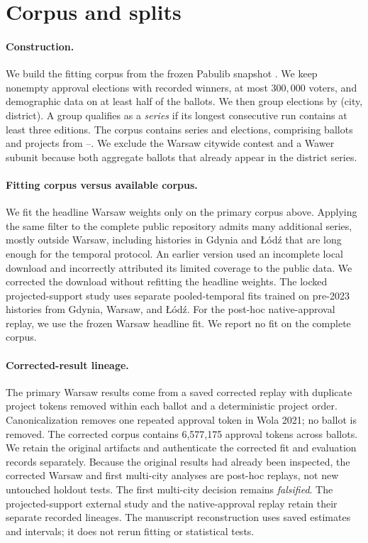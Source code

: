 \section{Corpus and splits}
\label{app:corpus}

\paragraph{Construction.}
We build the fitting corpus from the frozen Pabulib snapshot
\citep{stolicki2020pabulib}. We keep nonempty approval elections with recorded
winners, at most $300{,}000$ voters, and demographic data on at least half
of the ballots. We then group elections by (city, district). A group qualifies
as a \emph{series} if its longest consecutive run contains at least three
editions. The corpus contains
\NumSeriesTotal{} series and \PrimaryElectionN{} elections, comprising
\PrimaryBallotN{} ballots and \PrimaryProjectN{} projects from
\PrimaryYearLo--\PrimaryYearHi. We exclude the Warsaw citywide contest and a
Wawer subunit because both aggregate ballots that already appear in the
district series.

\paragraph{Fitting corpus versus available corpus.}
We fit the headline Warsaw weights only on the primary corpus above. Applying
the same filter to the complete public repository admits many additional
series, mostly outside Warsaw, including histories in Gdynia and \L{}\'od\'z
that are long enough for the temporal protocol. An earlier version used an
incomplete local download and incorrectly attributed its limited coverage to
the public data. We corrected the download without refitting the headline
weights. The locked projected-support study uses separate pooled-temporal
fits trained on pre-2023 histories from Gdynia, Warsaw, and \L{}\'od\'z. For
the post-hoc native-approval replay, we use the frozen Warsaw headline fit.
We report no fit on the complete corpus.

\paragraph{Corrected-result lineage.}
The primary Warsaw results come from a saved corrected replay with duplicate
project tokens removed within each ballot and a deterministic project order.
Canonicalization removes one repeated approval token in Wola 2021; no ballot
is removed. The corrected corpus contains 6,577,175 approval tokens across
\PrimaryBallotN{} ballots. We retain the original artifacts and authenticate
the corrected fit and evaluation records separately. Because the original
results had already been inspected, the corrected Warsaw and first multi-city
analyses are post-hoc replays, not new untouched holdout tests. The first
multi-city decision remains \emph{falsified}. The projected-support external
study and the native-approval replay retain their separate recorded lineages.
The manuscript reconstruction uses saved estimates and intervals; it does not
rerun fitting or statistical tests.

